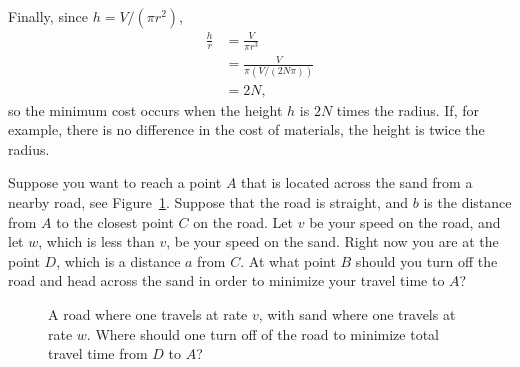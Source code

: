 \begin{example}
\begin{solution}
    Finally, since $h=V/(\pi r^2)$, 
    \begin{align*}
    \frac{h}{r}&=\frac{V}{\pi r^3}\\ 
    &=\frac{V}{\pi(V/(2N\pi))}\\ 
    &=2N,
    \end{align*}
    so the minimum cost occurs when the height $h$ is $2N$ times the
    radius. If, for example, there is no difference in the cost of
    materials, the height is twice the radius.
    \end{solution}
\end{example}
    
\begin{example}\label{exam:sand and road} Suppose you want to reach a point $A$ that is located across the
    sand from a nearby road, see Figure~\ref{fig:roadsand}.  Suppose that
    the road is straight, and $b$ is the distance from $A$ to the closest
    point $C$ on the road.  Let $v$ be your speed on the road, and let
    $w$, which is less than $v$, be your speed on the sand.  Right now you
    are at the point $D$, which is a distance $a$ from $C$.  At what point
    $B$ should you turn off the road and head across the sand in order to
    minimize your travel time to $A$? \cite{mooc}
    
    \begin{figure}[H]
        \centering
    
    \caption{A road where one travels at rate $v$, with sand where one
      travels at rate $w$. Where should one turn off of the road to
      minimize total travel time from $D$ to $A$?}
    \label{fig:roadsand}
    \end{figure}
    

\end{example}
